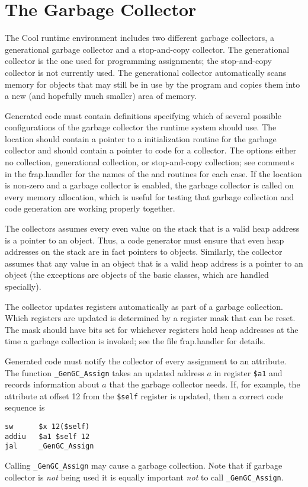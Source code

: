 \section{The Garbage Collector}

The Cool runtime environment includes two different garbage
collectors, a generational garbage collector and a stop-and-copy
collector.  The generational collector is the one used for programming
assignments; the stop-and-copy collector is not currently used.  The
generational collector automatically scans memory for objects that may
still be in use by the program and copies them into a new (and
hopefully much smaller) area of memory.

Generated code must contain definitions specifying which of several
possible configurations of the garbage collector the runtime system should
use.  The location  should contain a pointer
to a initialization routine for the garbage collector and 
 should contain a pointer to code for a collector.
The options either no collection, generational collection, or stop-and-copy
collection; see comments in the \U{trap.handler} for the names of the
 and  routines for each case.  If the
location  is non-zero and a garbage collector is enabled,
the garbage collector is called on every memory allocation, which is useful
for testing that garbage collection and code generation are working properly
together.

The collectors assumes every even value on the stack that is a valid heap
address is a pointer to an object.  Thus, a code generator must ensure
that even heap addresses on the stack are in fact pointers to objects.
Similarly, the collector assumes that any value in an object that is
a valid heap address is a pointer to an object (the exceptions are objects
of the basic classes, which are handled specially).

The collector updates registers automatically as part of a garbage collection.
Which registers are updated is determined by a register mask that can be
reset.  The mask should have bits set for whichever registers hold heap
addresses at the time a garbage collection is invoked; see the file
\U{trap.handler} for details.

Generated code must notify the collector of every assignment to an
attribute.  The function {\tt \_GenGC\_Assign} takes an updated
address $a$ in register {\tt \$a1} and records information about $a$
that the garbage collector needs.  If, for example, the attribute at
offset 12 from the {\tt \$self} register is updated, then a correct
code sequence is
\begin{verbatim}
sw      $x 12($self)
addiu   $a1 $self 12
jal     _GenGC_Assign
\end{verbatim}
Calling {\tt \_GenGC\_Assign} may cause a garbage collection.  Note
that if garbage collector is {\em not} being used it is equally important
{\em not} to call {\tt \_GenGC\_Assign}.  



